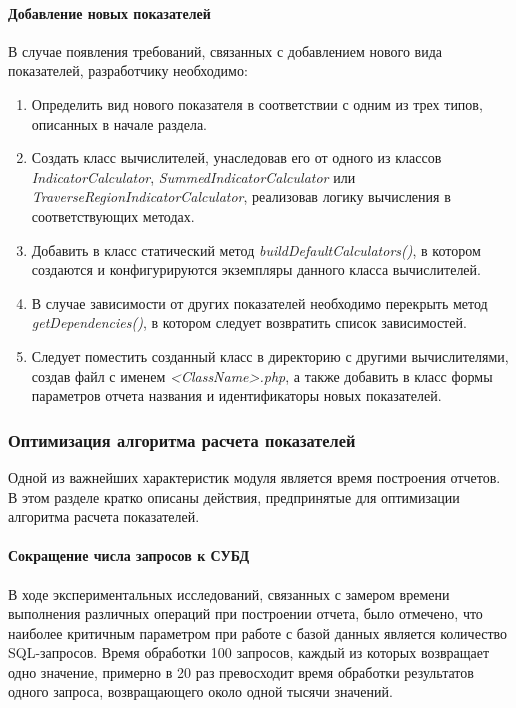 \paragraph{Добавление новых показателей} В случае появления требований, связанных с добавлением
нового вида показателей, разработчику необходимо:
\begin{enumerate}
\item{
  Определить вид нового показателя в соответствии с одним из трех типов, описанных в начале раздела. 
}
\item{
  Создать класс вычислителей, унаследовав его от одного из классов
\textit{IndicatorCalculator}, \textit{SummedIndicatorCalculator} или \textit{TraverseRegionIndicatorCalculator},
реализовав логику вычисления в соответствующих методах.
}
\item{
  Добавить в класс статический метод \textit{buildDefaultCalculators()}, в котором создаются и 
конфигурируются экземпляры данного класса вычислителей.
}
\item{
  В случае зависимости от других показателей необходимо перекрыть метод \textit{getDependencies()},
в котором следует возвратить список зависимостей.
}
\item{
  Следует поместить созданный класс в директорию с другими вычислителями, создав файл с именем \textit{<ClassName>.php},
  а также добавить в класс формы параметров отчета названия и идентификаторы новых показателей.
}
\end{enumerate}

\subsubsection{Оптимизация алгоритма расчета показателей}
Одной из важнейших характеристик модуля является время построения отчетов.
В этом разделе кратко описаны действия, предпринятые для оптимизации алгоритма расчета
показателей.

\paragraph{Сокращение числа запросов к СУБД}
В ходе экспериментальных исследований, связанных с замером времени выполнения различных операций
при построении отчета, было отмечено, что наиболее критичным параметром при работе с базой данных
является количество SQL-запросов. Время обработки 100 запросов, каждый из которых возвращает
одно значение, примерно в 20 раз превосходит время обработки результатов одного запроса,
возвращающего около одной тысячи значений.

